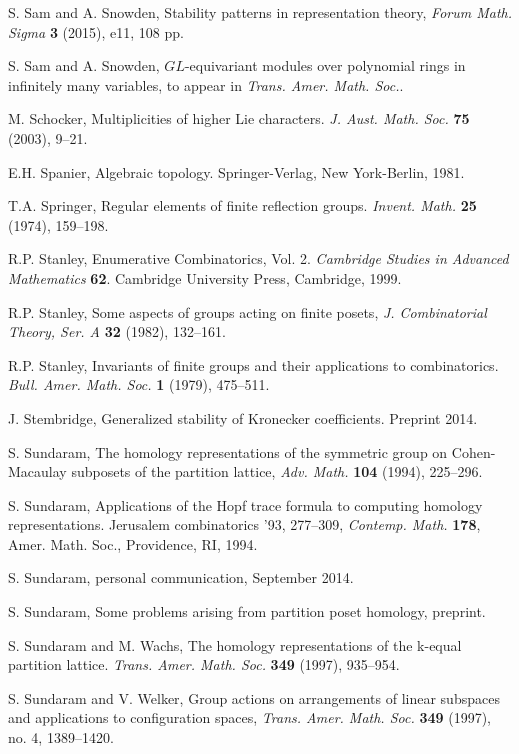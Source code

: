 \documentclass[12pt]{amsart}
\theoremstyle{plain}
\theoremstyle{definition}
\begin{document}
\begin{thebibliography}{99}
S. Sam and A. Snowden,
Stability patterns in representation theory, {\it Forum Math. Sigma} {\bf 3} (2015), e11, 108 pp.

S. Sam and A. Snowden, 
$GL$-equivariant modules over polynomial rings in infinitely many variables, 
to appear in {\it Trans. Amer. Math. Soc.}.

M. Schocker,
Multiplicities of higher Lie characters. 
{\it J. Aust. Math. Soc.} {\bf 75} (2003), 9--21. 

E.H. Spanier, 
Algebraic topology.
Springer-Verlag, New York-Berlin, 1981.

T.A. Springer, 
Regular elements of finite reflection groups.
{\it Invent. Math.} {\bf 25} (1974), 159--198. 

R.P. Stanley, Enumerative Combinatorics, Vol. 2.  
{\it Cambridge Studies in Advanced Mathematics} {\bf 62}.  
Cambridge University Press, Cambridge, 1999. 

R.P. Stanley, Some aspects of groups acting on finite posets, {\it J. Combinatorial Theory, Ser. A} {\bf 32} (1982), 132--161.

R.P. Stanley, 
Invariants of finite groups and their applications to combinatorics.
{\it Bull. Amer. Math. Soc.} {\bf 1} (1979), 475--511. 

J. Stembridge, Generalized stability of Kronecker coefficients.
Preprint 2014.

 S. Sundaram, The homology representations of the symmetric group on Cohen-Macaulay subposets of the partition lattice, {\it Adv. Math.} {\bf 104} (1994), 225--296.

 S. Sundaram, 
Applications of the Hopf trace formula to computing homology representations. 
Jerusalem combinatorics '93, 277--309,
{\it Contemp. Math.} {\bf 178}, Amer. Math. Soc., Providence, RI, 1994. 

S. Sundaram, personal communication, September 2014.

 S. Sundaram, Some problems arising from partition poset homology, preprint.

S. Sundaram and M. Wachs,
The homology representations of the k-equal partition lattice.
{\it Trans. Amer. Math. Soc.} {\bf 349} (1997), 935--954. 

 S. Sundaram and V. Welker, Group actions on arrangements of linear subspaces and applications to configuration spaces, {\it Trans. Amer. Math. Soc.} {\bf 349}  (1997), no. 4, 1389--1420.


\end{thebibliography}
\end{document}

